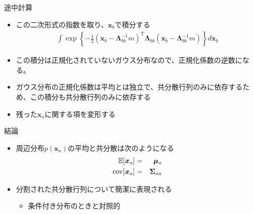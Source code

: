 \begin{frame}{途中計算}
 \begin{itemize}
  \item この二次形式の指数を取り、$\bm{x}_b$で積分する
        \begin{eqnarray}
         \int \exp\left\{-\frac{1}{2}(\bm{x}_b-\bm{\Lambda}_{bb}^{-1}m)^{\mathrm{T}}\bm{\Lambda}_{bb}(\bm{x}_b-\bm{\Lambda}_{bb}^{-1}m)\right\}d\bm{x}_b
        \end{eqnarray}
  \item この積分は正規化されていないガウス分布なので、正規化係数の逆数になる。
  \item ガウス分布の正規化係数は平均とは独立で、共分散行列のみに依存するため、この積分も共分散行列のみに依存する
  \item 残った$\bm{x}_a$に関する項を変形する
 \end{itemize}
\end{frame}

\begin{frame}{結論}
 \begin{itemize}
  \item 周辺分布$p(\bm{x}_a)$の平均と共分散は次のようになる
        \begin{eqnarray}
         \mathbb{E}[\bm{x}_a] &=&  \bm{\mu}_a\\
         {\rm cov}[\bm{x}_a]&=&\bm{\Sigma}_{aa}
        \end{eqnarray}
  \item 分割された共分散行列について簡潔に表現される
        \begin{itemize}
         \item 条件付き分布のときと対照的
        \end{itemize}
 \end{itemize}
\end{frame}

